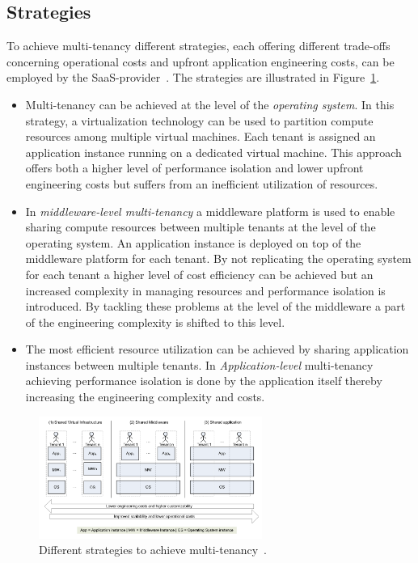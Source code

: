 \subsection{Strategies}
To achieve multi-tenancy different strategies, each offering different trade-offs concerning operational costs and upfront application engineering costs, can be employed by the SaaS-provider~\cite{WalravenS.2011Amlf}. The strategies are illustrated in Figure~\ref{muti-tenant-strategies}.
\begin{itemize}
\item Multi-tenancy can be achieved at the level of the \textit{operating system}. In this strategy, a virtualization technology can be used to partition compute resources among multiple virtual machines. Each tenant is assigned an application instance running on a dedicated virtual machine. This approach offers both a higher level of performance isolation and lower upfront engineering costs but suffers from an inefficient utilization of resources.
\item In \textit{middleware-level multi-tenancy} a middleware platform is used to enable sharing compute resources between multiple tenants at the level of the operating system. An application instance is deployed on top of the middleware platform for each tenant. By not replicating the operating system for each tenant a higher level of cost efficiency can be achieved but an increased complexity in managing resources and  performance isolation is introduced. By tackling these problems at the level of the middleware a part of the engineering complexity is shifted to this level.
\item The most efficient resource utilization can be achieved by sharing application instances between multiple tenants. In \textit{Application-level} multi-tenancy achieving performance isolation is done by the application itself thereby increasing the engineering complexity and costs.
\end{itemize}


\begin{figure}[H]

\caption{Different strategies to achieve multi-tenancy~\cite{WalravenS.2011Amlf}.\label{muti-tenant-strategies} }
\centering
\includegraphics[width=0.65\textwidth]{chapter-background/muti-tenant-strategies.png}
\end{figure}


